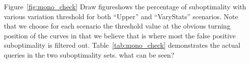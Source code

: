 {Figure~\ref{fig:mono_check} {\todo Draw figure}shows the percentage of suboptimality with various
variation threshold for both ``Upper'' and ``VaryStats'' scenarios. Note that
we choose for each scenario the threshold value at the obvious turning position
of the curves in that we believe that is where most the false positive 
suboptimality is filtered out. Table~\ref{tab:mono_check} demonstrates the
actual queries in the two suboptimality sets. {\todo what can be seen? }
}

